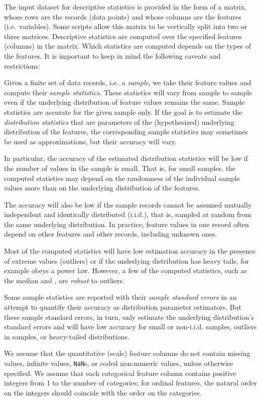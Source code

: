 The input dataset for descriptive statistics is provided in the form of a matrix, whose
rows are the records (data points) and whose columns are the features (i.e.~variables).
Some scripts allow this matrix to be vertically split into two or three matrices.  Descriptive
statistics are computed over the specified features (columns) in the matrix.  Which
statistics are computed depends on the types of the features.  It is important to keep
in mind the following caveats and restrictions:
\begin{Enumerate}
\item  Given a finite set of data records, i.e.~a \emph{sample}, we take their feature
values and compute their \emph{sample statistics}.  These statistics
will vary from sample to sample even if the underlying distribution of feature values
remains the same.  Sample statistics are accurate for the given sample only.
If the goal is to estimate the \emph{distribution statistics} that are parameters of
the (hypothesized) underlying distribution of the features, the corresponding sample
statistics may sometimes be used as approximations, but their accuracy will vary.
\item  In particular, the accuracy of the estimated distribution statistics will be low
if the number of values in the sample is small.  That is, for small samples, the computed
statistics may depend on the randomness of the individual sample values more than on
the underlying distribution of the features.
\item  The accuracy will also be low if the sample records cannot be assumed mutually
independent and identically distributed (i.i.d.), that is, sampled at random from the
same underlying distribution.  In practice, feature values in one record often depend
on other features and other records, including unknown ones.
\item  Most of the computed statistics will have low estimation accuracy in the presence of
extreme values (outliers) or if the underlying distribution has heavy tails, for example
obeys a power law.  However, a few of the computed statistics, such as the median and
\NameStatRho{}, are \emph{robust} to outliers.
\item  Some sample statistics are reported with their \emph{sample standard errors}
in an attempt to quantify their accuracy as distribution parameter estimators.  But these
sample standard errors, in turn, only estimate the underlying distribution's standard
errors and will have low accuracy for small or \mbox{non-i.i.d.} samples, outliers in samples,
or heavy-tailed distributions.
\item  We assume that the quantitative (scale) feature columns do not contain missing
values, infinite values, \texttt{NaN}s, or coded non-numeric values, unless otherwise
specified.  We assume that each categorical feature column contains positive integers
from 1 to the number of categories; for ordinal features, the natural order on
the integers should coincide with the order on the categories.
\end{Enumerate}






